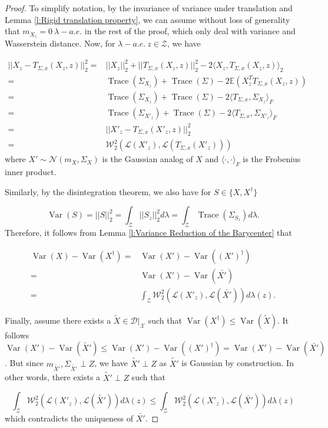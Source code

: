 \documentclass[twoside,11pt]{article}
\DeclareMathOperator{\trace}{Trace}
\DeclareMathOperator{\var}{Var}
\begin{document}
\begin{proof}
To simplify notation, by the invariance of variance under translation and Lemma \ref{l:Rigid translation property}, we can assume without loss of generality that $m_{X_z} = 0 \ \lambda-a.e.$ in the rest of the proof, which only deal with variance and Wasserstein distance. Now, for $\lambda-a.e. \ z \in \mathcal{Z}$, we have

\begin{align*}
||X_z - T_{\Sigma,x}(X_z,z)||^2_2 = &  ||X_z||^2_2 + ||T_{\Sigma,x}(X_z,z)||^2_2 - 2 \langle X_z, T_{\Sigma,x}(X_z,z) \rangle_2 \\
= & \trace(\Sigma_{X_z})  + \trace(\Sigma) - 2 \mathbb{E}(X_z^T T_{\Sigma,x}(X_z,z)) \\
= & \trace(\Sigma_{X_z})  + \trace(\Sigma) - 2 \langle T_{\Sigma,x},  \Sigma_{X_z} \rangle_F \\
= & \trace(\Sigma_{X'_z})  + \trace(\Sigma) - 2 \langle T_{\Sigma,x},  \Sigma_{X'_z} \rangle_F \\
= & ||X'_z - T_{\Sigma,x}(X'_z,z)||^2_2\\
= & \mathcal{W}_2^2 (\mathcal{L}(X'_z), \mathcal{L}(T_{\Sigma,x}(X'_z)))
\end{align*}
where $X' \sim \mathcal{N}(m_{X}, \Sigma_{X})$ is the Gaussian analog of $X$ and $\langle \cdot, \cdot \rangle_F$ is the Frobenius inner product.

Similarly, by the disintegration theorem, we also have for $S \in \{X, X^{\dag}\}$

\begin{equation}
\var(S) = ||S||^2_2 = \int_{\mathcal{Z}} ||S_z||^2_2 d\lambda = \int_{\mathcal{Z}} \trace(\Sigma_{S_z}) d\lambda.
\end{equation}
Therefore, it follows from Lemma \ref{l:Variance Reduction of the Barycenter} that

\begin{align*}
\var(X) - \var(X^{\dag}) = & \var(X') - \var((X')^{\dag})\\
= & \var(X') - \var(\bar{X'})\\
= & \int_{\mathcal{Z}} \mathcal{W}_2^2(\mathcal{L}(X'_z), \mathcal{L}(\bar{X'})) d\lambda(z).
\end{align*}

Finally, assume there exists a $\tilde{X} \in \mathcal{D}|_{\mathcal{X}}$ such that $\var(X^{\dag}) \leq \var(\tilde{X})$. It follows $\var(X') - \var(\tilde{X'}) \leq \var(X') - \var((X')^{\dag}) = \var(X') - \var(\bar{X'})$. But since $m_{\tilde{X'}}, \Sigma_{\tilde{X'}} \perp Z$, we have $\tilde{X'} \perp Z$ as $\tilde{X'}$ is Gaussian by construction. In other words,  there exists a $\tilde{X'} \perp Z$ such that

\begin{equation}
\int_{\mathcal{Z}} \mathcal{W}_2^2(\mathcal{L}(X'_z), \mathcal{L}(\tilde{X'})) d\lambda(z) \leq \int_{\mathcal{Z}} \mathcal{W}_2^2(\mathcal{L}(X'_z), \mathcal{L}(\bar{X'})) d\lambda(z)
\end{equation}
which contradicts the uniqueness of $\bar{X'}$.
\end{proof}
\end{document}
